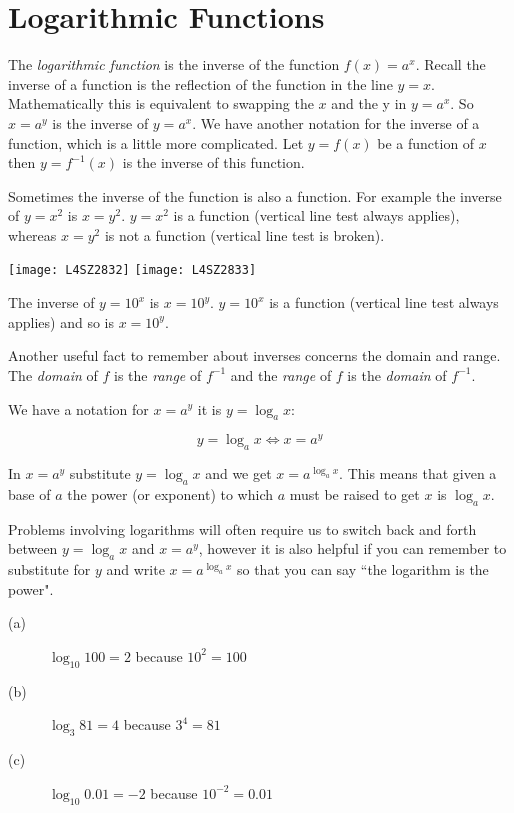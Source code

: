 \section{Logarithmic Functions}
The \emph{logarithmic function} is the inverse of the function $f (x) =a^{x}$. Recall the inverse of a function is the reflection of the function in the line $y =x$. Mathematically this is equivalent to swapping the $x$ and the y in $y =a^{x}$. So $x =a^{y}$ is the inverse of $y =a^{x}$. We have another notation for the inverse of a function, which is a little more complicated. Let $y =f (x)$ be a function of $x$ then $y =f^{ -1} (x)$ is the inverse of this function. 

Sometimes the inverse of the function is also a function. For example the inverse of $y =x^{2}$ is $x =y^{2}$. $y =x^{2}$ is a function (vertical line test always applies), whereas $x =y^{2}$ is not a function (vertical line test is broken). 

\begin{multicols}{2}
\texttt{[image: L4SZ2832]}
\texttt{[image: L4SZ2833]}
\end{multicols}

The inverse of $y =10^{x}$ is $x =10^{y}$. $y =10^{x}$ is a function (vertical line test always applies) and so is $x =10^{y}$. 

Another useful fact to remember about inverses concerns the domain and range. The \emph{domain}
of $f$ is the \emph{range} of $f^{ -1}$ and the \emph{range} of $f$ is the \emph{domain} of $f^{ -1}$. 

We have a notation for $x =a^{y}$ it is $y =\log _{a} x$:
\begin{tcolorbox}
\[y =\log _{a} x \Leftrightarrow x =a^y
\]
\end{tcolorbox}


In $x =a^{y}$ substitute $y =\log _{a} x$ and we get $x =a^{\log _{a} x}$. This means that given a base of $a$ the power (or exponent) to which $a$ must be raised to get $x$ is $\log _{a} x$. 

Problems involving logarithms will often require us to switch back and forth between $y =\log _{a} x$ and $x =a^{y}$, however it is also helpful if you can remember to substitute for $y$ and write $x =a^{\log _{a} x}$ so that you can say ``the logarithm is the power". 

\example
\begin{description}
	\item [(a)] $\log _{10} 100 =2$ because $10^{2} =100$ 
	
	\item [(b)] $\log _{3} 81 =4$ because $3^{4} =81$ 
	
	\item [(c)] $\log _{10} 0.01 = -2$ because $10^{ -2} =0.01$ \end{description}

